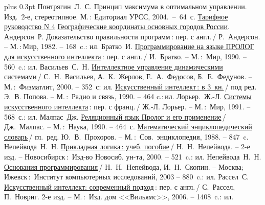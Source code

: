 \documentclass[a4paper,14pt, openany, twoside, draft]{extbook} %
\def\emphbib#1{#1}
\begin{document}
\begin{thebibliography}{99}\itemsep1pt \parskip 0pt plus 0.3pt
 Понтрягин~Л.~С. Принцип максимума в оптимальном управлении. Изд.~2-е, стереотипное. М.\,: Едиториал УРСС,  2004.~--~64~с.
 \href{http://mapservis.ru/docs/tar_ruc_4.htm}{Тарифное руководство N 4}
 \href{http://alextyurin.ru/?p=1037}{Географические координаты основных городов России}.
 Андерсон~Р. \emphbib{Доказательство правильности программ}\,{}: пер. с англ.\,{}/ Р.~Андерсон. -- М.\,:\,Мир, 1982. -- 168~c.: ил.
 Братко~И. \emphbib{\href{http://royallib.ru/book/bratko_ivan/programmirovanie_na_yazike_prolog_dlya_iskusstvennogo_intellekta.html}{Программирование на языке ПРОЛОГ для искусственного интеллекта}}\,{}: пер. с англ.\,/ И.~Братко. -- М.\,:~Мир, 1990. -- 560~c.: ил.
 Васильев~С.~Н. \emphbib{\href{http://bookfi.org/book/616050}{Интеллектное управление динамическими системами}}\,{}/ С.~Н.~Васильев, А.~К.~Жерлов, Е.~А.~Федосов, Б.~Е.~Федунов. -- М.\,:~Физматлит, 2000. -- 352~с: ил.
 \emphbib{\href{http://aihandbook.intsys.org.ru/index.php/intro/ai-handbook}{Искусственный интеллект\,{}: в 3~кн.}}\,{}/ под ред. Э.~В. Попова. -- М.\,:~Радио и связь, 1990. -- 464 c.:\,{}ил.
 Лорьер.~Ж.-Л.  \emphbib{\href{http://publ.lib.ru/ARCHIVES/L/LOR'ER_Jan_Lui/_Lor'er_J.L..html}{Системы искусственного интеллекта}\,{}: пер. с франц.}\,{}/ Ж.-Л. Лорьер. -- М.\,:~Мир, 1991. -- 568~с.: ил.
 Малпас~Дж. \emphbib{\href{http://padaread.com/?book=40731&pg=1}{Реляционный язык Пролог и его применение}}\,{}/ Дж.~Малпас. -- М.\,:~Наука, 1990. -- 464~с.
 \emphbib{\href{https://app.box.com/shared/793ukgvblxmj0hh6btw4}{Математический энциклопедический словарь}}\,{}/ гл.~ред. Ю.~В.~Прохоров. -- М.\,:~Сов.~энциклопедия, 1988. -- 847~c.
 Непейвода~Н.~Н. \emphbib{\href{http://www.logic-books.info/taxonomy/term/215}{Прикладная логика\,{}: учеб. пособие}}\,{}/ Н.~Н.~Непейвода. -- 2-е изд. -- Новосибирск\,{}:~Изд-во Новосиб. ун-та, 2000. -- 521~c.: ил.
 Непейвода~Н.~Н.  \emphbib{\href{http://philosophy.ru/library/logic_math/library/nepeivoda_prog.pdf}{Основания программирования}}\,{}/ Н.~Н.~Непейвода, И.~Н.~Скопин. -- Москва; Ижевск\,{}:~Институт компьютерных исследований, 2003 -- 880~c.: ил.
 Рассел~С. \href{http://www.aiportal.ru/downloads/books/ai-modern-approach-2-edition-by-rassel-norvig.html}{Искусственный интеллект: современный подход}\,{}: пер. с англ.\,{}/ С.~Рассел, П.~Новриг. 2-е изд. -- М.\,:~Изд. дом <<Вильямс>>, 2006. -- 1408~c.: ил.

\end{thebibliography}
\end{document}
